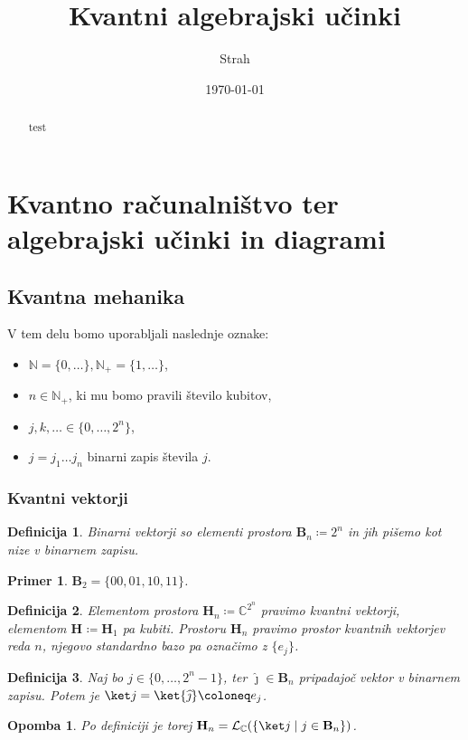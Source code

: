 \documentclass[a4paper]{article}
\title{Kvantni algebrajski učinki}
\author{Strah}
\date{\today}
\newtheorem{definition}{Definicija}
\newtheorem*{example}{Primer}
\newtheorem*{opomba}{Opomba}
\newcommand{\N}{\mathbb N}
\newcommand{\C}{\mathbb C}
\renewcommand{\hat}{\widehat}
\newcommand{\p}[1]{\left( {#1} \right)}
\newcommand{\set}[2]{\left\{ #1 \mid #2 \right\}}
\newcommand{\B}[1][]{\mathbf{B}_{#1}}
\renewcommand{\H}[1][]{\mathbf{H}_{#1}}
\renewcommand{\L}[2][]{\mathcal{L}_{#1}{\p{#2}}}
\begin{document}
\maketitle

\begin{abstract}
  test
\end{abstract}

\section{Kvantno računalništvo ter algebrajski učinki in diagrami}
\subsection{Kvantna mehanika}

V tem delu bomo uporabljali naslednje oznake:
\begin{itemize}
    \item \( \N = \{0, \dots \}, \N_+ = \{1, \dots\} \),
    \item \( n\in\N_+ \), ki mu bomo pravili število kubitov,
    \item \( j, k, \dots \in \{0, \dots, 2^n\} \),
    \item \( j = j_1\dots j_n \) binarni zapis števila \( j \).
\end{itemize}

\subsubsection{Kvantni vektorji}

\begin{definition}
    Binarni vektorji so elementi prostora \( \B[n] \coloneq 2^n \) in jih pišemo kot nize v binarnem zapisu.
\end{definition}

\begin{example}
    \(\B[2] = \{00, 01, 10, 11\}\).
\end{example}

\begin{definition}
    Elementom prostora \( \H[n] \coloneq \C^{2^n} \) pravimo kvantni vektorji, elementom \( \H \coloneq \H[1] \) pa kubiti.  Prostoru \( \H[n] \) pravimo prostor kvantnih vektorjev reda \( n \), njegovo standardno bazo pa označimo z \( \{e_j\} \).
\end{definition}

\begin{definition}%
    Naj bo \( j \in \{0, \dots, 2^n-1\} \), ter \( \hat{\jmath} \in \B[n] \) pripadajoč vektor v binarnem zapisu. Potem je \( \ket j = \ket{\hat{\jmath}} \coloneq e_j \).
\end{definition}
\begin{opomba}
    Po definiciji je torej \( \H[n] = \L[\C]{\set{\ket j}{j\in\B[n]}} \).
\end{opomba}
\end{document}

